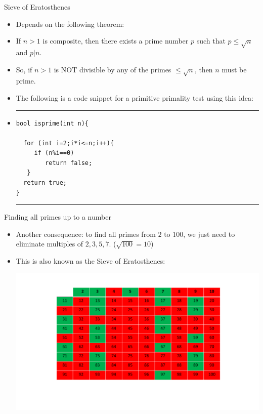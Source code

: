 \documentclass[ %
 usenames,dvipsnames,
aspectratio=169,11pt ]{beamer}
\newenvironment{stepitemize}{\begin{itemize}[<+->]}{\end{itemize} }
\begin{document}
\begin{frame}[fragile]{Sieve of Eratosthenes}
\begin{stepitemize}
\item Depends on the following theorem:
\item If $n>1$ is composite, then there exists a prime number $p$ such that $p\leq \sqrt{n}$ and $p|n$.
\item So, if $n>1$ is NOT divisible by any of the primes $\leq \sqrt{n}$, then $n$ must be prime.
\item The following is a code snippet for a primitive primality test using this idea:

\item[] \rule{\textwidth}{1pt}
\begin{verbatim}
bool isprime(int n){

  for (int i=2;i*i<=n;i++){
     if (n%i==0)
        return false;
   }
  return true;
}
\end{verbatim}
\rule{\textwidth}{1pt}
\end{stepitemize}

\end{frame}

\begin{frame}{Finding all primes up to a number}
\begin{stepitemize}
\item Another consequence: to find all primes from $2$ to $100$, we just need to eliminate multiples of $2,3,5,7$. ($\sqrt{100}=10$)
\item This is also known as the Sieve of Eratosthenes:

\bigskip

\begin{center}
    \includegraphics[scale=.40]{erat.pdf}
\end{center}

\end{stepitemize}
\end{frame}
\end{document}
